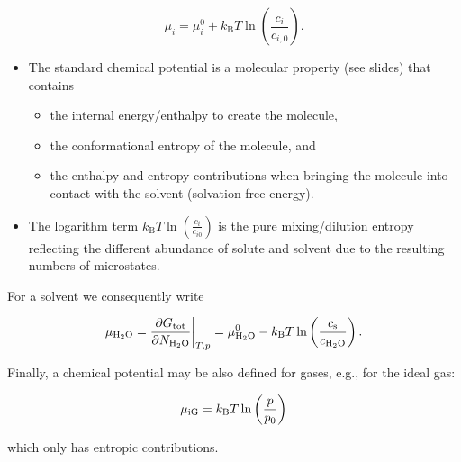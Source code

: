 \documentclass[letterpaper,10pt,english]{sphinxmanual}
\begin{document}
\sphinxAtStartPar
\begin{equation}
\mu_i=\mu_i^0+k_\mathrm{B} T \ln \left ( \frac{c_i}{c_{i,0}}\right ).
\end{equation}
\begin{itemize}
\item {} 
\sphinxAtStartPar
The standard chemical potential is a molecular property (see slides) that contains
\begin{itemize}
\item {} 
\sphinxAtStartPar
the internal energy/enthalpy to create the molecule,

\item {} 
\sphinxAtStartPar
the conformational entropy of the molecule, and

\item {} 
\sphinxAtStartPar
the enthalpy and entropy contributions when bringing the molecule into contact with the solvent (solvation free energy).

\end{itemize}

\item {} 
\sphinxAtStartPar
The logarithm term \(k_\mathrm{B} T \ln \left ( \frac{c_i}{c_{i0}}\right )\) is the pure mixing/dilution entropy reflecting the different abundance of solute and solvent due to the resulting numbers of microstates.

\end{itemize}

\sphinxAtStartPar
For a solvent we consequently write

\sphinxAtStartPar
\begin{equation}
\mu_{\rm H_2O}=\frac{\partial G_{\rm tot}}{\partial N_{\rm H_2O}}\bigg|_{T,p}=\mu_{\rm H_2O}^{0}-k_\mathrm{B} T\ln\left ( \frac{c_{\rm s}}{c_{\rm H_2O}}\right).
\end{equation}

\sphinxAtStartPar
Finally, a chemical potential may be also defined for gases, e.g., for the ideal gas:

\sphinxAtStartPar
\begin{equation}
\mu_{\rm iG}=k_\mathrm{B} T \ln\left (\frac{p}{p_0}\right)
\end{equation}

\sphinxAtStartPar
which only has entropic contributions.
\end{document}
